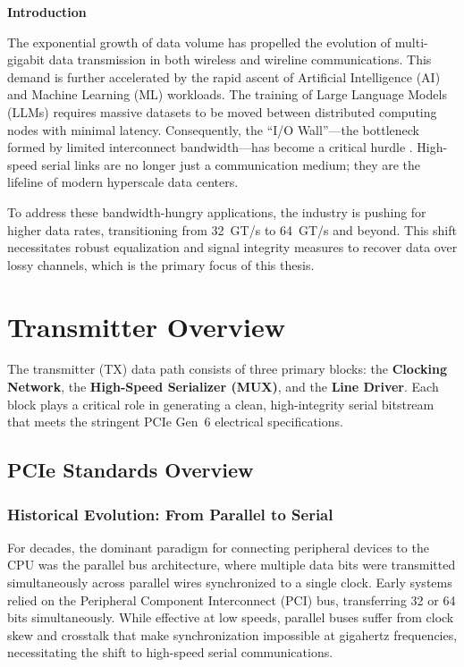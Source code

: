 \newpage
\thispagestyle{empty}
{}

\begin{center}\huge \textbf{Introduction}\end{center}

The exponential growth of data volume has propelled the evolution of multi-gigabit 
data transmission in both wireless and wireline communications. This demand is further 
accelerated by the rapid ascent of Artificial Intelligence (AI) and Machine Learning 
(ML) workloads. The training of Large Language Models (LLMs) requires massive datasets 
to be moved between distributed computing nodes with minimal latency. Consequently, 
the ``I/O Wall''---the bottleneck formed by limited interconnect bandwidth---has become 
a critical hurdle \cite{9269409}. High-speed serial links are no longer just a 
communication medium; they are the lifeline of modern hyperscale data centers.

To address these bandwidth-hungry applications, the industry is pushing for higher data 
rates, transitioning from 32~GT/s to 64~GT/s and beyond. This shift necessitates robust 
equalization and signal integrity measures to recover data over lossy channels, which is 
the primary focus of this thesis.

\section*{Transmitter Overview}

The transmitter (TX) data path consists of three primary blocks: the \textbf{Clocking 
Network}, the \textbf{High-Speed Serializer (MUX)}, and the \textbf{Line Driver}. Each 
block plays a critical role in generating a clean, high-integrity serial bitstream that 
meets the stringent PCIe Gen~6 electrical specifications.

\subsection*{PCIe Standards Overview}

\subsubsection*{Historical Evolution: From Parallel to Serial}
For decades, the dominant paradigm for connecting peripheral devices to the CPU was the 
parallel bus architecture, where multiple data bits were transmitted simultaneously across 
parallel wires synchronized to a single clock. Early systems relied on the Peripheral 
Component Interconnect (PCI) bus, transferring 32 or 64 bits simultaneously. While 
effective at low speeds, parallel buses suffer from clock skew and crosstalk that make 
synchronization impossible at gigahertz frequencies, necessitating the shift to 
high-speed serial communications.

